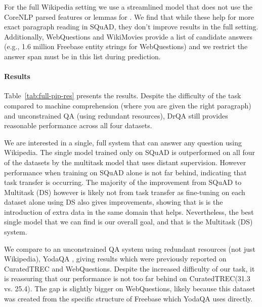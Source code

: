 \documentclass[11pt,a4paper]{article}
\newcommand\lcurq{CuratedTREC\xspace}
\newcommand\wq{WebQuestions\xspace}
\newcommand\us{DrQA\xspace}
\begin{document}
For the full Wikipedia setting we use a streamlined model that does not use the CoreNLP parsed  features or lemmas for . We find that while these help for more exact paragraph reading in SQuAD, they don't improve results in the full setting. Additionally, WebQuestions and WikiMovies provide a list of candidate answers (e.g., 1.6 million Freebase entity strings for WebQuestions) and we restrict the answer span must be in this list during prediction.

\paragraph{Results}
Table~\ref{tab:full-pip-res} presents the results.
Despite the difficulty of the task compared to machine comprehension (where you are given the right paragraph) and unconstrained QA (using redundant resources), \us still provides reasonable performance across all four datasets.

We are interested in a single, full system that can answer any question using Wikipedia. The single model trained only on SQuAD is outperformed on all four of the datasets by the multitask model that uses distant supervision.
However performance when training on SQuAD alone is not far behind, indicating that task transfer is occurring.
The majority of the improvement from SQuAD to Multitask (DS) however is likely not from task transfer as fine-tuning on each dataset alone using DS also gives improvements, showing that is is the introduction of extra data in the same domain that helps. Nevertheless, the best single model that we can find is our overall goal, and that is the Multitask (DS) system.





We compare to an unconstrained QA system using redundant resources (not just Wikipedia), YodaQA \cite{baudivs2015yodaqa}, giving results which were previously reported on \lcurq and \wq. Despite the increased difficulty of our task, it is reassuring that our performance is not too far behind on \lcurq (31.3 vs. 25.4). The gap is slightly bigger on \wq, likely because this dataset was created from the specific structure of Freebase which YodaQA uses directly.
\end{document}
